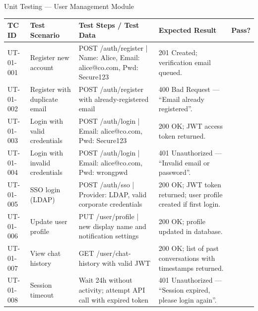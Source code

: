 \documentclass[aspectratio=169,xcolor=dvipsnames]{beamer}
\newcommand{\cmark}{\checkmark}
\newcommand{\tw}{\textwidth}
\begin{document}
\begin{frame}{Unit Testing — User Management Module}
  \tiny\renewcommand{\arraystretch}{0.88}
  \begin{table}
    \centering
    \setlength{\tabcolsep}{2pt}
    \begin{tabular}{p{.09\tw}|p{.15\tw}|p{.44\tw}|p{.18\tw}|p{.07\tw}}
      \toprule
      \textbf{TC ID} & \textbf{Test Scenario} & \textbf{Test Steps / Test Data} & \textbf{Expected Result} & \textbf{Pass?}\\
      \midrule
      UT-01-001 & Register new account &
        POST /auth/register | Name: Alice, Email: alice@co.com, Pwd: Secure123 &
        201 Created; verification email queued. & \textcolor{green!60!black}{\cmark}\\
      \midrule
      UT-01-002 & Register with duplicate email &
        POST /auth/register with already-registered email &
        400 Bad Request — ``Email already registered''. & \textcolor{green!60!black}{\cmark}\\
      \midrule
      UT-01-003 & Login with valid credentials &
        POST /auth/login | Email: alice@co.com, Pwd: Secure123 &
        200 OK; JWT access token returned. & \textcolor{green!60!black}{\cmark}\\
      \midrule
      UT-01-004 & Login with invalid credentials &
        POST /auth/login | Email: alice@co.com, Pwd: wrongpwd &
        401 Unauthorized — ``Invalid email or password''. & \textcolor{green!60!black}{\cmark}\\
      \midrule
      UT-01-005 & SSO login (LDAP) &
        POST /auth/sso | Provider: LDAP, valid corporate credentials &
        200 OK; JWT token returned; user profile created if first login. & \textcolor{green!60!black}{\cmark}\\
      \midrule
      UT-01-006 & Update user profile &
        PUT /user/profile | new display name and notification settings &
        200 OK; profile updated in database. & \textcolor{green!60!black}{\cmark}\\
      \midrule
      UT-01-007 & View chat history &
        GET /user/chat-history with valid JWT &
        200 OK; list of past conversations with timestamps returned. & \textcolor{green!60!black}{\cmark}\\
      \midrule
      UT-01-008 & Session timeout &
        Wait 24h without activity; attempt API call with expired token &
        401 Unauthorized — ``Session expired, please login again''. & \textcolor{green!60!black}{\cmark}\\
      \bottomrule
    \end{tabular}
  \end{table}
\end{frame}
\end{document}
